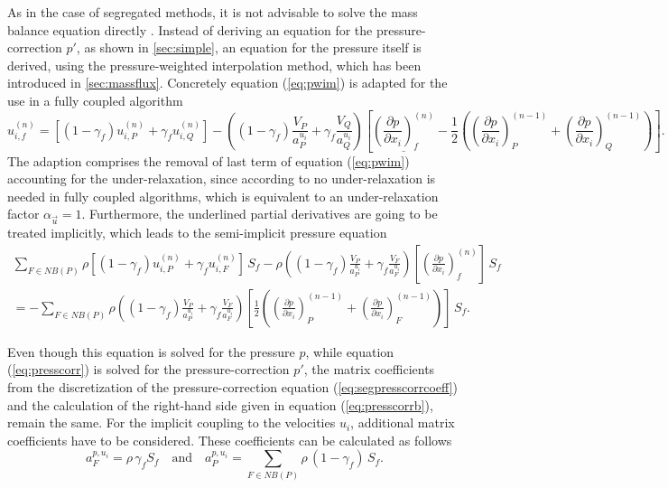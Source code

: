 As in the case of segregated methods, it is not advisable to solve the mass balance equation directly \cite{schaefer99}. Instead of deriving an equation for the pressure-correction \(p'\), as shown in \ref{sec:simple}, an equation for the pressure itself is derived, using the pressure-weighted interpolation method, which has been introduced in \ref{sec:massflux}. Concretely equation (\ref{eq:pwim}) is adapted for the use in a fully coupled algorithm
\begin{displaymath}
  u_{i,f}^{(n)} 
  =
  \left[\left(1 - \gamma_f\right) u_{i,P}^{(n)} + \gamma_f u_{i,Q}^{(n)} \right]
  - \left(\left(1 - \gamma_f\right) \frac{V_P}{a_P^{u_i}} + \gamma_f \frac{ V_Q}{a_Q^{u_i}}\right)
  \left[ 
    \underline{ \left(\frac{\partial p}{\partial x_i}\right)_f^{(n)}}
  - \frac{1}{2} 
  \left( 
    \left( \frac{\partial p}{\partial x_i} \right)_P^{(n-1)} 
  + \left(\frac{\partial p}{\partial x_i}\right)_Q^{(n-1)} 
  \right)
  \right].
\end{displaymath}
The adaption comprises the removal of last term of equation (\ref{eq:pwim}) accounting for the under-relaxation, since according to \cite{darwish09} no under-relaxation is needed in fully coupled algorithms, which is equivalent to an under-relaxation factor \(\alpha_\vec{u} = 1\). Furthermore, the underlined partial derivatives are going to be treated implicitly, which leads to the semi-implicit pressure equation
\begin{align*}
  \sum_{F \in NB(P)} 
  \rho
  \left[\left(1 - \gamma_f\right) u_{i,P}^{(n)} + \gamma_f u_{i,F}^{(n)} \right]\,  S_f
  - \rho \left(\left(1 - \gamma_f\right) \frac{ V_P}{a_P^{u_i}} + \gamma_f \frac{ V_F}{a_F^{u_i}}\right)
  \left[ 
  \left(\frac{\partial p}{\partial x_i}\right)_f^{(n)}
  \right]\,  S_f \nonumber \\
  =
  - \sum_{F \in NB(P)}
  \rho
  \left(\left(1 - \gamma_f\right) \frac{ V_P}{a_P^{u_i}} + \gamma_f \frac{ V_F}{a_F^{u_i}}\right)
  \left[ 
  \frac{1}{2} 
  \left( 
    \left( \frac{\partial p}{\partial x_i} \right)_P^{(n-1)} 
  + \left(\frac{\partial p}{\partial x_i}\right)_F^{(n-1)} 
  \right)
  \right] \, S_f.
\end{align*}

Even though this equation is solved for the pressure \(p\), while equation (\ref{eq:presscorr}) is solved for the pressure-correction \(p'\), the matrix coefficients from the discretization of the pressure-correction equation (\ref{eq:segpresscorrcoeff}) and the calculation of the right-hand side given in equation (\ref{eq:presscorrb}), remain the same. For the implicit coupling to the velocities \(u_i\), additional matrix coefficients have to be considered. These coefficients can be calculated as follows
\begin{displaymath}
  a_F^{p,u_i} = \rho \, \gamma_f S_f \quad \text{and} \quad a_P^{p,u_i} = \sum_{F \in NB(P)} \rho \, (1-\gamma_f) \, S_f.
\end{displaymath}

